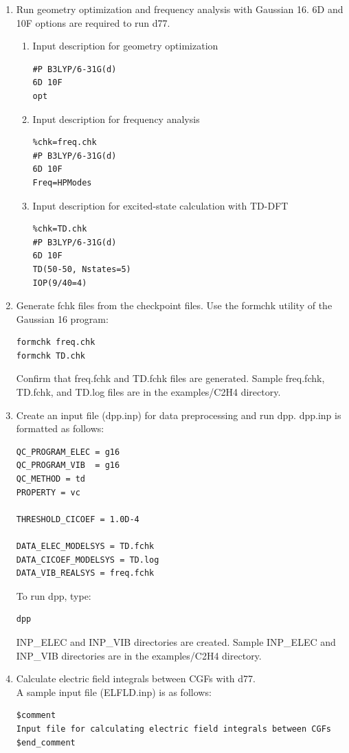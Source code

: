 ﻿\documentclass[11pt,a4paper,openany]{article}
\begin{document}
\begin{enumerate}
\item{
Run geometry optimization and frequency analysis with Gaussian 16.\cite{g16} 
6D and 10F options are required to run d77.
}

\begin{enumerate}
\item{
Input description for geometry optimization
\begin{verbatim}
#P B3LYP/6-31G(d)
6D 10F
opt
\end{verbatim}
}

\item{
Input description for frequency analysis 
\begin{verbatim}
%chk=freq.chk
#P B3LYP/6-31G(d)
6D 10F
Freq=HPModes
\end{verbatim}
}

\item{
Input description for excited-state calculation with TD-DFT
\begin{verbatim}
%chk=TD.chk
#P B3LYP/6-31G(d)
6D 10F
TD(50-50, Nstates=5)
IOP(9/40=4)
\end{verbatim}
}
\end{enumerate}

\item{
Generate fchk files from the checkpoint files.  
Use the formchk utility of the Gaussian 16 program:
\begin{verbatim}
formchk freq.chk
formchk TD.chk
\end{verbatim}
}
Confirm that freq.fchk and TD.fchk files are generated. 
Sample freq.fchk, TD.fchk, and TD.log files are in the examples/C2H4 directory.

\item{
Create an input file (dpp.inp) for data preprocessing and run dpp. dpp.inp is formatted as follows:
\begin{verbatim}
QC_PROGRAM_ELEC = g16
QC_PROGRAM_VIB  = g16
QC_METHOD = td
PROPERTY = vc

THRESHOLD_CICOEF = 1.0D-4

DATA_ELEC_MODELSYS = TD.fchk
DATA_CICOEF_MODELSYS = TD.log
DATA_VIB_REALSYS = freq.fchk
\end{verbatim}
To run dpp, type:
\begin{verbatim} 
dpp
\end{verbatim}
INP\_ELEC and INP\_VIB directories are created. Sample INP\_ELEC and INP\_VIB directories are in the examples/C2H4 directory.
}

\item{
Calculate electric field integrals between CGFs with d77.\\
A sample input file (ELFLD.inp) is as follows:
\begin{verbatim}
$comment
Input file for calculating electric field integrals between CGFs
$end_comment


\end{verbatim}}
\end{enumerate}
\end{document}

